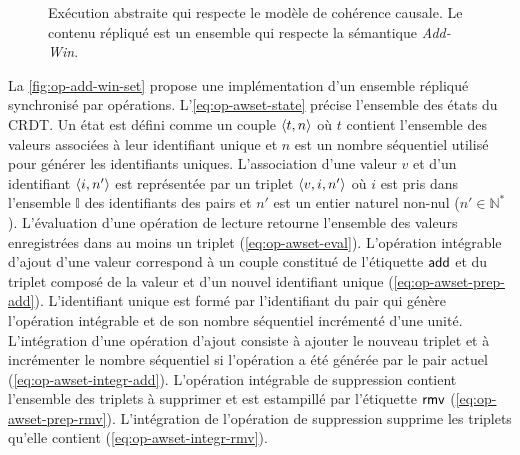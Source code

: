 \begin{figure}[tbh]
\centering
{}
\caption[Ensemble répliqué qui respecte la sémantique \emph{Add-Win}]{Exécution abstraite qui respecte le modèle de cohérence causale.
Le contenu répliqué est un ensemble qui respecte la sémantique \emph{Add-Win}.}\label{fig:awset-example}
\end{figure}

La \autoref{fig:op-add-win-set} propose une implémentation d'un ensemble répliqué synchronisé par opérations.
L'\autoref{eq:op-awset-state} précise l'ensemble des états du \ac{CRDT}.
Un état est défini comme un couple $\tuple*{t, n}$ où $t$ contient l'ensemble des valeurs associées à leur identifiant unique et $n$ est un nombre séquentiel utilisé pour générer les identifiants uniques.
L'association d'une valeur $v$ et d'un identifiant $\tuple*{i, n'}$ est représentée par un triplet $\tuple*{v, i, n'}$ où $i$ est pris dans l'ensemble $\mathbb{I}$ des identifiants des pairs et $n'$ est un entier naturel non-nul ($n' \in \mathbb{N}^*$).
L'évaluation d'une opération de lecture retourne l'ensemble des valeurs enregistrées dans au moins un triplet (\autoref{eq:op-awset-eval}).
L'opération intégrable d'ajout d'une valeur correspond à un couple constitué de l'étiquette $\trm{add}$ et du triplet composé de la valeur et d'un nouvel identifiant unique (\autoref{eq:op-awset-prep-add}).
L'identifiant unique est formé par l'identifiant du pair qui génère l'opération intégrable et de son nombre séquentiel incrémenté d'une unité.
L'intégration d'une opération d'ajout consiste à ajouter le nouveau triplet et à incrémenter le nombre séquentiel si l'opération a été générée par le pair actuel (\autoref{eq:op-awset-integr-add}).
L'opération intégrable de suppression contient l'ensemble des triplets à supprimer et est estampillé par l'étiquette $\trm{rmv}$ (\autoref{eq:op-awset-prep-rmv}).
L'intégration de l'opération de suppression supprime les triplets qu'elle contient (\autoref{eq:op-awset-integr-rmv}).

